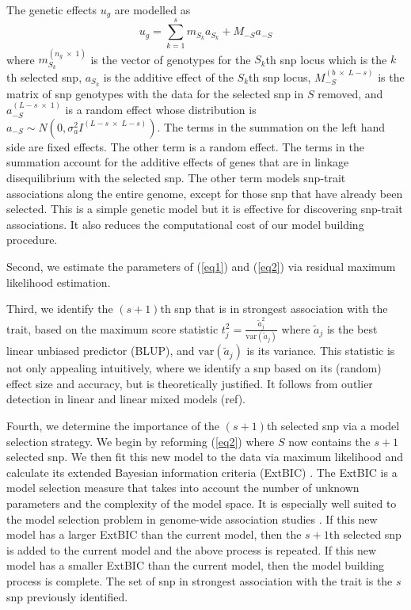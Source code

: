\documentclass{nature}
\begin{document}
The genetic effects $u_g$ are modelled as 
\begin{equation}
\label{eq2}
u_g = \sum_{k=1}^s  m_{S_k} a_{S_k} + M_{-S} a_{-S}
\end{equation}
where $m_{S_k}^{(n_g \; \times \; 1)}$ is the vector of genotypes for the $S_k$th snp locus which is the $k$th selected snp, 
$a_{S_k}$ is the additive effect of the $S_k$th snp locus, $M_{-S}^{(b \; \times \; L-s)}$ is the matrix of  snp genotypes 
with the data for the selected snp in $S$ removed,  and $a_{-S}^{(L-s \; \times  \; 1)}$ is a random effect whose distribution is 
$a_{-S} \sim N(0, \sigma_a^2 I^{(L-s \; \times \;  L-s)})$. 
The terms in the summation on the left hand side are fixed effects.  The other term is a random effect.  The terms 
in the summation account 
for the additive effects of genes that are in linkage disequilibrium with the selected snp. The other term models 
snp-trait associations along the entire genome, except for those snp that have already been selected. 
This is a simple genetic model but it 
is effective for discovering snp-trait associations. It also reduces the computational cost of our model building procedure. 


Second, we estimate the parameters of (\ref{eq1}) and (\ref{eq2}) via residual maximum likelihood estimation. 

Third, we identify the $(s+1)$th snp that is in strongest association with the trait, based on the maximum score statistic
$t_j^2 = \frac{ \widetilde{a} _j^2}{\textrm{var}(\widetilde{a}_j)}$ where $\widetilde{a}_j$ is the best linear unbiased predictor (BLUP), 
and $\textrm{var}(\widetilde{a}_j)$ is its variance. This statistic is not only appealing intuitively, where we 
identify a snp based on its (random) effect size and accuracy, but is theoretically justified.  It follows from outlier detection 
in linear and linear mixed models (ref). 

Fourth, we determine the importance of the $(s+1)$th selected snp via a model selection strategy. 
We begin by reforming (\ref{eq2}) where $S$ now contains the $s + 1$ selected snp.  We then fit this new model to the data
via maximum likelihood and calculate its extended Bayesian information criteria (ExtBIC) \cite{chen2008extended}.  The ExtBIC is a model selection measure that takes into account the number of unknown parameters and the complexity 
of the model space.  It is especially well suited to the model selection problem in genome-wide association studies \cite{chen2008extended}. If this new model has a larger ExtBIC than the current model, then the $s+1$th selected snp is added to 
the current model and the above process is repeated. If this new model has a smaller ExtBIC than the current model, then the 
model building process is complete. The set of snp in strongest association with the trait is the $s$ snp previously identified. 
\end{document}
